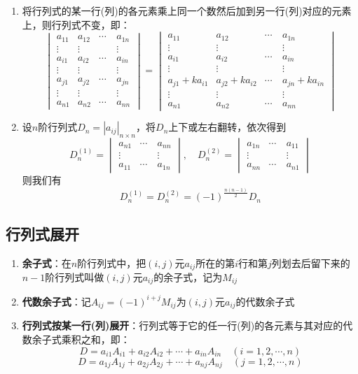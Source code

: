 \documentclass[12pt,a4paper,UTF8]{book}
\begin{document}
\begin{enumerate}
\item 将行列式的某一行(列)的各元素乘上同一个数然后加到另一行(列)对应的元素上，则行列式不变，即：
\[\begin{vmatrix}a_{11}&a_{12}&\cdots&a_{1n}\\\vdots&\vdots&\quad&\vdots\\a_{i1}&a_{i2}&\cdots&a_{in}\\\vdots&\vdots&\quad&\vdots\\a_{j1}&a_{j2}&\cdots&a_{jn}\\\vdots&\vdots&\quad&\vdots\\a_{n1}&a_{n2}&\cdots&a_{nn}\end{vmatrix}=\begin{vmatrix}a_{11}&a_{12}&\cdots&a_{1n}\\\vdots&\vdots&\quad&\vdots\\a_{i1}&a_{i2}&\cdots&a_{in}\\\vdots&\vdots&\quad&\vdots\\a_{j1}+ka_{i1}&a_{j2}+ka_{i2}&\cdots&a_{jn}+ka_{in}\\\vdots&\vdots&\quad&\vdots\\a_{n1}&a_{n2}&\cdots&a_{nn}\end{vmatrix}\]
\item 设$n$阶行列式$D_n=\left|a_{ij}\right|_{n\times n}$，将$D_n$上下或左右翻转，依次得到
\[D_n^{\left(1\right)}=\begin{vmatrix}a_{n1}&\cdots&a_{nn}\\\vdots&\quad&\vdots\\a_{11}&\cdots&a_{1n}\end{vmatrix},\quad D_n^{\left(2\right)}=\begin{vmatrix}a_{1n}&\cdots&a_{11}\\\vdots&\quad&\vdots\\a_{nn}&\cdots&a_{n1}\end{vmatrix}\]
则我们有
\[D_n^{\left(1\right)}=D_n^{\left(2\right)}=\left(-1\right)^{\frac{n\left(n-1\right)}{2}}D_n\]
\end{enumerate}

\subsection{行列式展开}
\begin{enumerate}
\item \textbf{余子式}：在$n$阶行列式中，把$\left(i,j\right)$元$a_{ij}$所在的第$i$行和第$j$列划去后留下来的$n-1$阶行列式叫做$\left(i,j\right)$元$a_{ij}$的余子式，记为$M_{ij}$
\item  \textbf{代数余子式}：记$A_{ij}=\left(-1\right)^{i+j}M_{ij}$为$\left(i,j\right)$元$a_{ij}$的代数余子式
\item \textbf{行列式按某一行(列)展开}：行列式等于它的任一行(列)的各元素与其对应的代数余子式乘积之和，即：
\[D=a_{i1}A_{i1}+a_{i2}A_{i2}+\cdots+a_{in}A_{in}\quad\left(i=1,2,\cdots,n\right)\]
\[D=a_{1j}A_{1j}+a_{2j}A_{2j}+\cdots+a_{nj}A_{nj}\quad\left(j=1,2,\cdots,n\right)\]
\end{enumerate}
\end{document}
